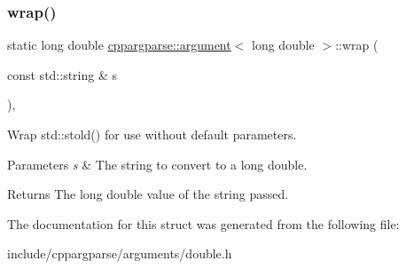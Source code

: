 \subsubsection{\texorpdfstring{wrap()}{wrap()}}
{\footnotesize\ttfamily static long double \hyperlink{structcppargparse_1_1argument}{cppargparse\+::argument}$<$ long double $>$\+::wrap (\begin{DoxyParamCaption}\item[{const std\+::string \&}]{s }\end{DoxyParamCaption})\hspace{0.3cm}{\ttfamily [inline]}, {\ttfamily [static]}}



Wrap std\+::stold() for use without default parameters. 


\begin{DoxyParams}{Parameters}
{\em s} & The string to convert to a long double.\\
\hline
\end{DoxyParams}
\begin{DoxyReturn}{Returns}
The long double value of the string passed. 
\end{DoxyReturn}


The documentation for this struct was generated from the following file\+:\begin{DoxyCompactItemize}
\item 
include/cppargparse/arguments/double.\+h\end{DoxyCompactItemize}
